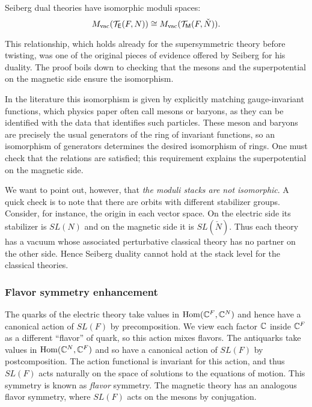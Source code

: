 \documentclass[11pt]{amsart}
\begin{document}
\begin{prop}
Seiberg dual theories have isomorphic moduli spaces:
\[
M_{\rm vac}(\mathcal T_{\mathsf E}(F,N)) \cong M_{\rm vac}(\mathcal T_{{\sf M}}(F,\check{N})).
\]
\end{prop}

This relationship, which holds already for the supersymmetric theory before twisting, was one of the original pieces of evidence offered by Seiberg for his duality.
The proof boils down to checking that the mesons and the superpotential on the magnetic side ensure the isomorphism.

\begin{rmk}
In the literature this isomorphism is given by explicitly matching gauge-invariant functions, 
which physics paper often call mesons or baryons, 
as they can be identified with the data that identifies such particles.
These meson and baryons are precisely the usual generators of the ring of invariant functions, 
so an isomorphism of generators determines the desired isomorphism of rings. 
One must check that the relations are satisfied;
this requirement explains the superpotential on the magnetic side.
\end{rmk}

We want to point out, however, that {\em the moduli stacks are not isomorphic}.
A quick check is to note that there are orbits with different stabilizer groups.
Consider, for instance, the origin in each vector space.
On the electric side its stabilizer is $SL(N)$ and on the magnetic side it is $SL(\check{N})$.
Thus each theory has a vacuum whose associated perturbative classical theory has no partner on the other side.
Hence Seiberg duality cannot hold at the stack level for the classical theories.

\subsubsection{Flavor symmetry enhancement}

The quarks of the electric theory take values in ${\rm Hom}(\mathbb C^F, \mathbb C^N)$ and hence have a canonical action of $SL(F)$ by precomposition.
We view each factor $\mathbb C$ inside $\mathbb C^F$ as a different ``flavor'' of quark, so this action mixes flavors.
The antiquarks take values in ${\rm Hom}(\mathbb C^N, \mathbb C^F)$ and so have a canonical action of $SL(F)$ by postcomposition.
The action functional is invariant for this action, and thus $SL(F)$ acts naturally on the space of solutions to the equations of motion.
This symmetry is known as {\em flavor} symmetry.
The magnetic theory has an analogous flavor symmetry, where $SL(F)$ acts on the mesons by conjugation.
\end{document}
